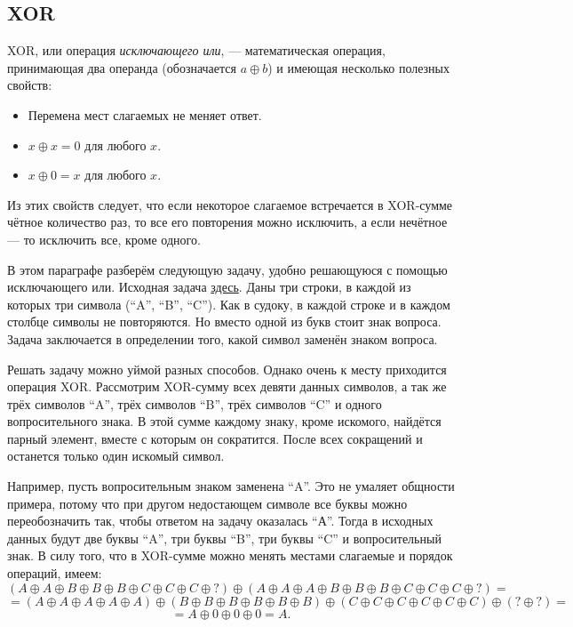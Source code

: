 \documentclass[a4paper,8pt]{article}
\begin{document}
    \subsection{XOR}

    XOR, или операция \emph{исключающего или}, --- математическая операция, принимающая два операнда (обозначается \(a \oplus b\)) и имеющая несколько полезных свойств:
    \begin{itemize}
        \item Перемена мест слагаемых не меняет ответ.
        \item \(x \oplus x = 0\) для любого $x$.
        \item \(x \oplus 0 = x\) для любого $x$.
    \end{itemize}
    Из этих свойств следует, что если некоторое слагаемое встречается в XOR-сумме чётное количество раз, то все его повторения можно исключить, а если нечётное --- то исключить все, кроме одного.

    В этом параграфе разберём следующую задачу, удобно решающуюся с помощью исключающего или. Исходная задача \href{https://codeforces.com/contest/1915/problem/B}{здесь}. Даны три строки, в каждой из которых три символа (``A'', ``B'', ``C''). Как в судоку, в каждой строке и в каждом столбце символы не повторяются. Но вместо одной из букв стоит знак вопроса. Задача заключается в определении того, какой символ заменён знаком вопроса.

    Решать задачу можно уймой разных способов. Однако очень к месту приходится операция XOR. Рассмотрим XOR-сумму всех девяти данных символов, а так же трёх символов ``A'', трёх символов ``B'', трёх символов ``C'' и одного вопросительного знака. В этой сумме каждому знаку, кроме искомого, найдётся парный элемент, вместе с которым он сократится. После всех сокращений и останется только один искомый символ.
    
    Например, пусть вопросительным знаком заменена ``A''. Это не умаляет общности примера, потому что при другом недостающем символе все буквы можно переобозначить так, чтобы ответом на задачу оказалась ``А''. Тогда в исходных данных будут две буквы ``A'', три буквы ``B'', три буквы ``C'' и вопросительный знак. В силу того, что в XOR-сумме можно менять местами слагаемые и порядок операций, имеем:
    \[(A \oplus A \oplus B \oplus B \oplus B \oplus C \oplus C \oplus C \oplus ?) \oplus (A \oplus A \oplus A \oplus B \oplus B \oplus B \oplus C \oplus C \oplus C \oplus ?)=\]\[=(A \oplus A \oplus A \oplus A \oplus A) \oplus (B \oplus B \oplus B \oplus B \oplus B \oplus B) \oplus (C \oplus C \oplus C \oplus C \oplus C \oplus C) \oplus (? \oplus ?)=\]\[=A \oplus 0 \oplus 0 \oplus 0 = A.\]
\end{document}
